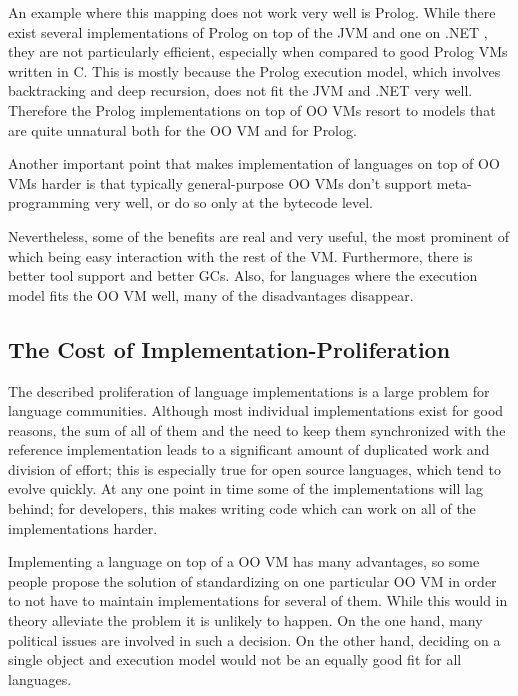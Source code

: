 \documentclass{llncs}
\begin{document}
\begin{itemize}
An example where this mapping does not work very well is Prolog. While there
exist several implementations of Prolog on top of the JVM \cite{prologcafe}
\cite{InterProlog} and one on .NET \cite{psharp},
they are not particularly efficient, especially when compared to good Prolog VMs
written in C. This is mostly because the Prolog execution model, which
involves backtracking and deep recursion, does not fit the JVM and .NET very
well. Therefore the Prolog implementations on top of OO VMs resort to models
that are quite unnatural both for the OO VM and for Prolog.

Another important point that makes implementation of languages on top of OO VMs
harder is that typically general-purpose OO VMs don't support meta-programming
very well, or do so only at the bytecode level.
\end{itemize}

Nevertheless, some of the benefits are real and very useful, the most
prominent of which being easy interaction with the rest of the VM. Furthermore, there
is better tool support and better GCs. Also, for languages where the execution
model fits the OO VM well, many of the disadvantages disappear.


\subsection{The Cost of Implementation-Proliferation}

The described proliferation of language implementations is a large problem for
language communities. Although most individual implementations exist for good
reasons, the sum of all of them and the need to keep them synchronized with the
reference implementation leads to a significant amount of duplicated work and division of
effort; this is especially true for open source languages, which tend to evolve
quickly. At any one point in time some of the implementations will lag behind;
for developers, this makes writing code which can work on all of the
implementations harder.

Implementing a language on top of a OO VM has many advantages, so some
people propose the solution of standardizing on one particular OO VM in order
to not have
to maintain implementations for several of them. While this would in theory
alleviate the problem it is unlikely to happen. On the one hand, many political
issues are involved in such a decision. On the other hand, deciding on a single
object and execution model would not be an equally good fit for all languages.
\end{document}
